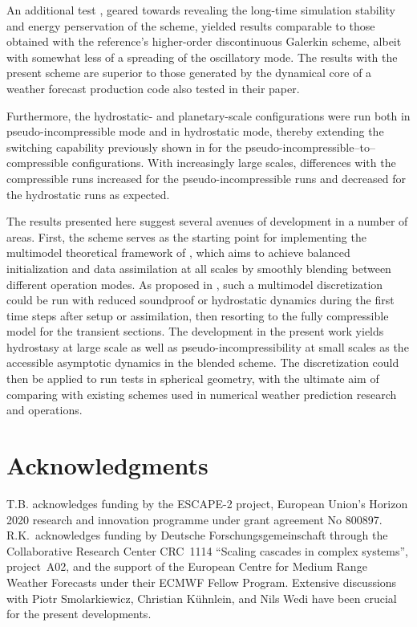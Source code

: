 \documentclass[12pt,a4paper]{article}
\theoremstyle{definition}
\begin{document}
An additional test \cite{BaldaufBrdar2013}, geared towards revealing the long-time simulation stability and energy perservation of the scheme, yielded results comparable to those obtained with the reference's higher-order discontinuous Galerkin scheme, albeit with somewhat less of a spreading of the oscillatory mode. The results with the present scheme are superior to those generated by the dynamical core of a weather forecast production code also tested in their paper. 

Furthermore, the hydrostatic- and planetary-scale configurations were run both in pseudo-incompressible mode and in hydrostatic mode, thereby extending the switching capability previously shown in \cite{BenacchioEtAl2014} for the pseudo-incompressible--to--compressible configurations. With increasingly large scales, differences with the compressible runs increased for the pseudo-incompressible runs and decreased for the hydrostatic runs as expected.

The results presented here suggest several avenues of development in a number of areas. First, the scheme serves as the starting point for implementing the multimodel theoretical framework of \cite{KleinBenacchio2016}, which aims to achieve balanced initialization and data assimilation at all scales by smoothly blending between different operation modes. As proposed in \cite{BenacchioEtAl2014}, such a multimodel discretization could be run with reduced soundproof or hydrostatic dynamics during the first time steps after setup or assimilation, then resorting to the fully compressible model for the transient sections. The development in the present work yields hydrostasy at large scale as well as pseudo-incompressibility at small scales as the accessible asymptotic dynamics in the blended scheme. The discretization could then be applied to run tests in spherical geometry, with the ultimate aim of comparing with existing schemes used in numerical weather prediction research and operations.

\section*{Acknowledgments}

T.B. acknowledges funding by the ESCAPE-2 project, European Union's Horizon 2020 research and innovation programme under grant agreement No 800897. R.K.\ acknowledges funding by Deutsche Forschungsgemeinschaft through the Collaborative Research Center CRC~1114 ``Scaling cascades in complex systems'', project~A02, and the support of the European Centre for Medium Range Weather Forecasts under their ECMWF Fellow Program. Extensive discussions with Piotr Smolarkiewicz, Christian K\"uhnlein, and Nils Wedi have been crucial for the present developments. 
\end{document}
